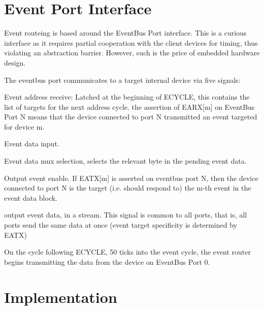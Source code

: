 
\section{Event Port Interface}


Event routeing is based around the EventBus Port interface. This is a
curious interface as it requires partial cooperation with the client
devices for timing, thus violating an abstraction barrier. However,
such is the price of embedded hardware design.


The eventbus port communicates to a target internal device via five signals:

 Event address receive: Latched at the beginning
of ECYCLE, this contains the list of targets for the next address
cycle. the assertion of EARX[m] on EventBus Port N means that the
device connected to port N transmitted an event targeted for device m. 

 Event data input. 

 Event data mux selection, selects the relevant
byte in the pending event data.

 Output event enable. If EATX[m] is asserted on
eventbus port N, then the device connected to port N is the target
(i.e. should respond to) the m-th event in the event data block.

 output event data, in a stream. This signal is common to all ports, that is, all ports send the same data at once (event target specificity is determined by EATX)



On the cycle following ECYCLE, 50 ticks into the event cycle, the
event router begins transmitting the data from the device on EventBus
Port 0.

\section{Implementation}

